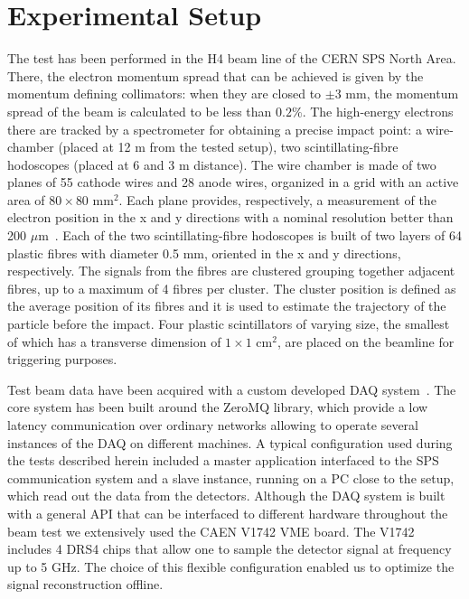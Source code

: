 \documentclass[a4paper,11pt]{article}
\begin{document}
\section{Experimental Setup}
\label{sec:experimentalsetup}
The test has been performed in the H4 beam line of the CERN SPS North Area. There, the electron momentum spread that can be achieved is given by the momentum defining collimators: when they are closed to $\pm 3$ mm, the momentum spread of the beam is calculated to be less than $0.2\%$\cite{r-GRA}. 
The high-energy electrons there are tracked by a spectrometer for obtaining a precise impact point: a wire-chamber (placed at 12 m from the tested setup), two scintillating-fibre hodoscopes (placed at 6 and 3 m distance). The wire chamber is made of two planes of 55 cathode wires and 28 anode wires, organized in a grid with an active area of $80\times 80$ mm$^2$. Each plane provides, respectively, a measurement of the electron position in the x and y directions with a nominal resolution better than 200 $\mu$m~\cite{r-SPA}.
Each of the two scintillating-fibre hodoscopes is built of two layers of 64 plastic fibres with diameter 0.5 mm, oriented in the x and y directions, respectively. The signals from the fibres are clustered grouping together adjacent fibres, up to a maximum of 4 fibres per cluster. The cluster position is defined as the average position of its fibres and it is used to estimate the trajectory of the particle before the impact.
Four plastic scintillators of varying size, the smallest of which has a transverse dimension of $1 \times 1$ cm$^2$, are placed on the beamline for triggering purposes.

Test beam data have been acquired with a custom developed DAQ system~\cite{r-MAR}. The core system has been built around the ZeroMQ library, which provide a low latency communication over ordinary networks allowing to operate several instances of the DAQ on different machines. A typical  configuration used during the tests described  herein included a master application interfaced to the SPS communication system and a slave instance, running on a PC close to the setup, which read out the data from the detectors. Although the DAQ system is built with a general API that can be interfaced to different hardware throughout the beam test we extensively used the CAEN V1742 VME board. The V1742 includes 4 DRS4 chips that allow one to sample the detector signal at frequency up to 5 GHz. The choice of this flexible configuration enabled us to optimize the signal reconstruction offline.
\end{document}
